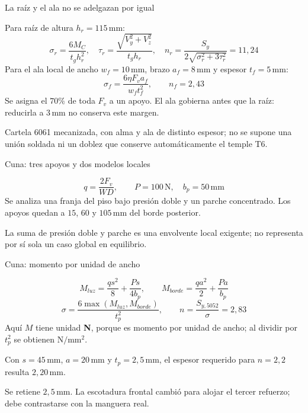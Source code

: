 \documentclass[10pt,aspectratio=169]{beamer}
\newcommand{\mm}{\,\mathrm{mm}}
\newcommand{\N}{\,\mathrm{N}}
\newcommand{\mcref}{Guía de diseño}
\begin{document}
\gdef\mcref{Mathcad: sección 10 / pág. 13}
\begin{frame}[t]{La raíz y el ala no se adelgazan por igual}

Para raíz de altura $h_r=115\mm$:
\[
\sigma_r=\frac{6M_C}{t_gh_r^2},\quad
\tau_r=\frac{\sqrt{V_y^2+V_z^2}}{t_gh_r},\quad
n_r=\frac{S_y}{2\sqrt{\sigma_r^2+3\tau_r^2}}=11{,}24
\]
Para el ala local de ancho $w_f=10\mm$, brazo $a_f=8\mm$ y espesor $t_f=5\mm$:
\[
\sigma_f=\frac{6\eta F_v a_f}{w_ft_f^2},\qquad n_f=2{,}43
\]
Se asigna el $70\%$ de toda $F_v$ a un apoyo. El ala gobierna antes que la raíz: reducirla a $3\mm$ no conserva este margen.

Cartela 6061 mecanizada, con alma y ala de distinto espesor; no se supone una unión soldada ni un doblez que conserve automáticamente el temple T6.

\end{frame}

\gdef\mcref{Mathcad: sección 11 / pág. 14-15}
\begin{frame}[t]{Cuna: tres apoyos y dos modelos locales}

\begin{center}\end{center}
\[
q=\frac{2F_v}{WD},\qquad P=100\N,\quad b_p=50\mm
\]
Se analiza una franja del piso bajo presión doble y un parche concentrado. Los apoyos quedan a $15$, $60$ y $105\mm$ del borde posterior.

La suma de presión doble y parche es una envolvente local exigente; no representa por sí sola un caso global en equilibrio.

\end{frame}

\gdef\mcref{Mathcad: sección 11 / pág. 14-15}
\begin{frame}[t]{Cuna: momento por unidad de ancho}

\[
M_{luz}=\frac{qs^2}{8}+\frac{Ps}{4b_p},\qquad
M_{borde}=\frac{qa^2}{2}+\frac{Pa}{b_p}
\]
\[
\sigma=\frac{6\max(M_{luz},M_{borde})}{t_p^2},\qquad
n=\frac{S_{y,5052}}{\sigma}=2{,}83
\]
Aquí $M$ tiene unidad \textbf{N}, porque es momento por unidad de ancho; al dividir por $t_p^2$ se obtienen $\mathrm{N/mm^2}$.

Con $s=45\mm$, $a=20\mm$ y $t_p=2{,}5\mm$, el espesor requerido para $n=2{,}2$ resulta $2{,}20\mm$.

Se retiene $2{,}5\mm$. La escotadura frontal cambió para alojar el tercer refuerzo; debe contrastarse con la manguera real.

\end{frame}
\end{document}
